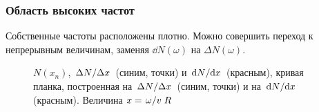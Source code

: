 \documentclass[compress]{beamer}
\begin{document}

    \begin{frame}\frametitle{Область высоких частот}

        Собственные частоты расположены плотно. Можно совершить переход к непрерывным величинам, заменяя $\dd{N(\omega)}$ на $\Delta N(\omega)$.

        \begin{figure}[h]
            \centering
            \caption[]{ $N(x_n)$,  $\flatfrac{\Delta N}{\Delta x}$ (синим, точки) и $\dv*{N}{x}$ (красным),  кривая планка, построенная на $\flatfrac{\Delta N}{\Delta x}$ (синим, точки) и на $\dv*{N}{x}$ (красным). Величина $x = \flatfrac{\omega}{v} R$}
        \end{figure}

    \end{frame}
\end{document}
